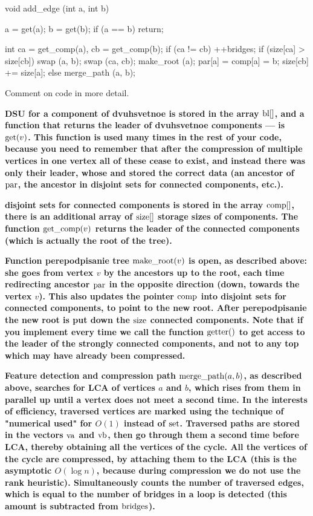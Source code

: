 void add_edge (int a, int b) {
a = get(a); b = get(b);
if (a == b) return;

int ca = get_comp(a),
cb = get_comp(b);
if (ca != cb) {
++bridges;
if (size[ca] > size[cb]) {
swap (a, b);
swap (ca, cb);
}
make_root (a);
par[a] = comp[a] = b;
size[cb] += size[a];
}
else
merge_path (a, b);
}
\endcode


Comment on code in more detail.

\bf{DSU for a component of dvuhsvetnoe} is stored in the array ${\rm bl}[]$, and a function that returns the leader of dvuhsvetnoe components --- is ${\rm get}(v)$. This function is used many times in the rest of your code, because you need to remember that after the compression of multiple vertices in one vertex all of these cease to exist, and instead there was only their leader, whose and stored the correct data (an ancestor of ${\rm par}$, the ancestor in disjoint sets for connected components, etc.).

\bf{disjoint sets for connected components} is stored in the array ${\rm comp}[]$, there is an additional array of ${\rm size}[]$ storage sizes of components. The function ${\rm get\_comp}(v)$ returns the leader of the connected components (which is actually the root of the tree).

\bf{Function perepodpisanie tree} ${\rm make\_root}(v)$ is open, as described above: she goes from vertex $v$ by the ancestors up to the root, each time redirecting ancestor $\rm par$ in the opposite direction (down, towards the vertex $v$). This also updates the pointer ${\rm comp}$ into disjoint sets for connected components, to point to the new root. After perepodpisanie the new root is put down the ${\rm size}$ connected components. Note that if you implement every time we call the function ${\rm getter} ()$ to get access to the leader of the strongly connected components, and not to any top which may have already been compressed.

\bf{Feature detection and compression path} ${\rm merge\_path}(a,b)$, as described above, searches for LCA of vertices $a$ and $b$, which rises from them in parallel up until a vertex does not meet a second time. In the interests of efficiency, traversed vertices are marked using the technique of "numerical used" for $O(1)$ instead of $\rm set$. Traversed paths are stored in the vectors $\rm va$ and $\rm vb$, then go through them a second time before LCA, thereby obtaining all the vertices of the cycle. All the vertices of the cycle are compressed, by attaching them to the LCA (this is the asymptotic $O(\log n)$, because during compression we do not use the rank heuristic). Simultaneously counts the number of traversed edges, which is equal to the number of bridges in a loop is detected (this amount is subtracted from $\rm bridges$).

